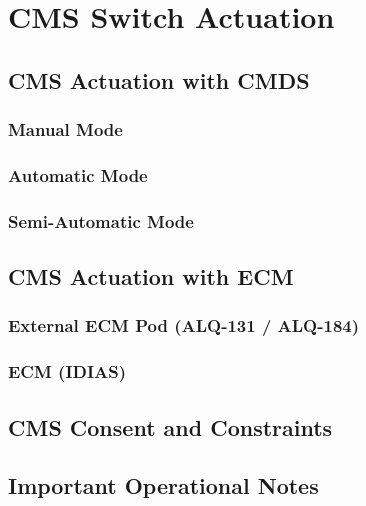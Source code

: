 \documentclass[11pt, a4paper, twoside]{report}
\begin{document}
\section{CMS Switch Actuation}

\subsection{CMS Actuation with CMDS}

\subsubsection{Manual Mode}

\subsubsection{Automatic Mode}

\subsubsection{Semi-Automatic Mode}

\subsection{CMS Actuation with ECM}

\subsubsection{External ECM Pod (ALQ-131 / ALQ-184)}

\subsubsection{ECM (IDIAS)}

\subsection{CMS Consent and Constraints}

\subsection{Important Operational Notes}
\end{document}
